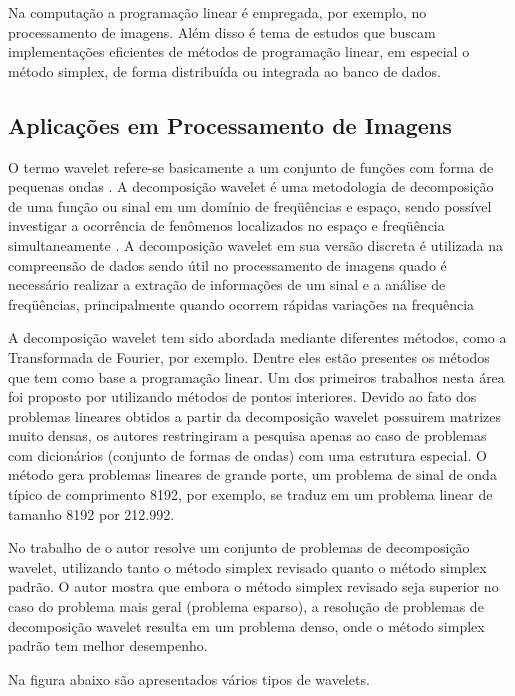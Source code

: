 Na computação a programação linear é empregada, por exemplo, no processamento de imagens. Além disso é tema de estudos que buscam implementações eficientes de métodos de programação linear, em especial o método simplex, de forma distribuída ou integrada ao banco de dados.

\subsection{Aplicações em Processamento de Imagens}
O termo wavelet refere-se basicamente a um conjunto de funções com forma de pequenas ondas \cite{Ondaletas}. A decomposição wavelet é uma metodologia de decomposição de uma função ou sinal em um domínio de freqüências e espaço, sendo possível investigar a ocorrência de fenômenos localizados no espaço e freqüência simultaneamente \cite{Peixoto-wavelet}.
A decomposição wavelet em sua versão discreta é utilizada na compreensão de dados sendo útil no processamento de imagens quado é necessário realizar a extração de informações de um sinal e a análise de freqüências, principalmente quando ocorrem rápidas variações na frequência \cite{Leite-wavelet}

A decomposição wavelet tem sido abordada mediante diferentes métodos, como a Transformada de Fourier, por exemplo. Dentre eles estão presentes os métodos que tem como base a programação linear. Um dos primeiros trabalhos nesta área foi proposto por  utilizando métodos de pontos interiores. Devido ao fato dos problemas lineares obtidos a partir da decomposição wavelet possuirem matrizes muito densas, os autores restringiram a pesquisa apenas ao caso de problemas com dicionários (conjunto de formas de ondas) com uma estrutura especial.  O método gera problemas lineares de grande porte, um problema de sinal de onda típico de comprimento 8192, por exemplo, se traduz em um problema linear de tamanho 8192 por 212.992.

No trabalho de  o autor resolve um conjunto de problemas de decomposição wavelet, utilizando tanto o método simplex revisado quanto o método simplex padrão. O autor mostra que embora o método simplex revisado seja superior no caso do problema mais geral (problema esparso), a resolução de problemas de decomposição wavelet resulta em um problema denso, onde o método simplex padrão tem melhor  desempenho.

Na figura abaixo são apresentados vários tipos de wavelets.

